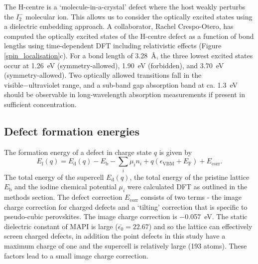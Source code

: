 The H-centre is a `molecule-in-a-crystal' defect where the host weakly perturbs the $I_2^-$ molecular ion.
This allows us to consider the optically excited states using a dielectric embedding approach.
A collaborator, Rachel Crespo-Otero, has computed the optically excited states of the H-centre defect as a function of bond lengths using time-dependent DFT including relativistic effects (Figure \ref{spin_localisation}c).\autocite{Whalley2017b} 
For a bond length of \SI{3.28}{\angstrom}, the three lowest excited states occur at \SI{1.26}{\electronvolt} (symmetry-allowed), \SI{1.90}{\electronvolt} (forbidden), and \SI{3.70}{\electronvolt} (symmetry-allowed). Two optically allowed transitions fall in the visible−ultraviolet range, and a sub-band gap absorption band at ca. \SI{1.3}{\electronvolt} should be observable in long-wavelength absorption measurements if present in sufficient concentration.

\subsection{Defect formation energies} \label{ss:dfe}

The formation energy of a defect in charge state $q$ is given by
\begin{equation} \label{eqn_formation_energy}
E_\mathrm{f}(q) = E_\mathrm{d}(q) - E_\mathrm{b} - \sum_i \mu_i n_i + q(\epsilon_\mathrm{VBM}+E_\mathrm{F}) + E_\mathrm{corr}.
\end{equation}
The total energy of the supercell $E_\mathrm{d}(q)$, the total energy of the pristine lattice $E_\mathrm{b}$ and the iodine chemical potential $\mu_i$ were calculated DFT as outlined in the methods section.
The defect correction $E_\mathrm{corr}$ consists of two terms - the image charge correction for charged defects and a `tilting' correction that is specific to pseudo-cubic perovskites.
The image charge correction is \SI{-0.057}{eV}. The static dielectric constant of MAPI is large ($\bar{\epsilon_0}=22.67$)\autocite{Brivio2013} and so the lattice can effectively screen charged defects, in addition the point defects in this study have a maximum charge of one and the supercell is relatively large (193 atoms). These factors lead to a small image charge correction.


